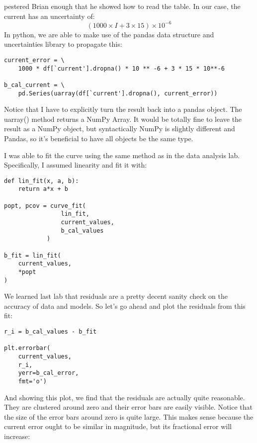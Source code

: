 \documentclass{article}
\begin{document}
pestered Brian enough that he showed how to read the table. In our case, the current 
has an uncertainty of:
$$(1000 \times I + 3 \times 15) \times 10^{-6}$$
In python, we are able to make use of the pandas data structure and
uncertainties library to propagate this:
\begin{verbatim}
current_error = \
    1000 * df[`current'].dropna() * 10 ** -6 + 3 * 15 * 10**-6

b_cal_current = \
    pd.Series(uarray(df[`current'].dropna(), current_error))
\end{verbatim}
Notice that I have to explicitly turn the result back into a
pandas object. The uarray() method returns a NumPy Array. It would be totally
fine to leave the result as a NumPy object, but syntactically NumPy is slightly
different and Pandas, so it's beneficial to have all objects be the same type.

I was able to fit the curve using the same method as in the data
analysis lab. Specifically, I assumed linearity and fit it with:

\begin{center}
\begin{minipage}[t]{.75\textwidth}
\begin{lstlisting}[frame=tlrb]
def lin_fit(x, a, b):
    return a*x + b

popt, pcov = curve_fit(
                lin_fit, 
                current_values, 
                b_cal_values
            )

b_fit = lin_fit(
    current_values, 
    *popt
)
\end{lstlisting}
\end{minipage}
\end{center}

We learned last lab that residuals are a pretty decent sanity check on the
accuracy of data and models. So let's go ahead and plot the residuals from this
fit:

\begin{center}
\begin{minipage}[t]{.75\textwidth}
\begin{lstlisting}[frame=tlrb]
r_i = b_cal_values - b_fit

plt.errorbar(
    current_values,
    r_i,
    yerr=b_cal_error,
    fmt='o')
\end{lstlisting}
\end{minipage}
\end{center}

And showing this plot, we find that the residuals are actually quite
reasonable. They are clustered around zero and their error bars are easily
visible. Notice that the size of the error bars around zero is quite large.
This makes sense because the current error ought to be similar in magnitude, but
its fractional error will increase:
\end{document}
